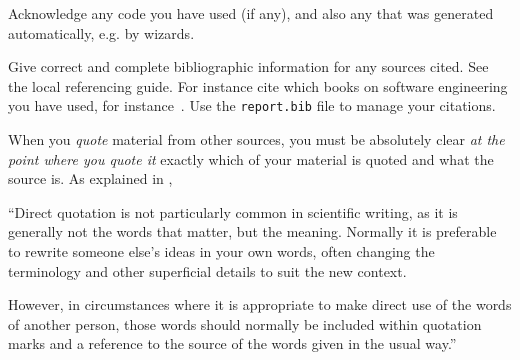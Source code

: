 \documentclass[10pt]{report}
\begin{document}



Acknowledge any code you have used (if any), and also any that was
generated automatically, e.g. by wizards.

Give correct and complete bibliographic information for any sources
cited. See the local referencing guide. For instance cite which
books on software engineering you have used, for
instance~\cite{software-design}. Use the \texttt{report.bib} file to
manage your citations.

When you \emph{quote} material from other sources, you must be
absolutely clear \emph{at the point where you quote it} exactly
which of your material is quoted and what the source is. As
explained in \cite{SoCS:plagiarism},

``Direct quotation is not particularly common in scientific writing,
as it is generally not the words that matter, but the meaning.
Normally it is preferable to rewrite someone else's ideas in your
own words, often changing the terminology and other superficial
details to suit the new context.

However, in circumstances where it is appropriate to make direct use
of the words of another person, those words should normally be
included within quotation marks and a reference to the source of the
words given in the usual way.''
\end{document}

